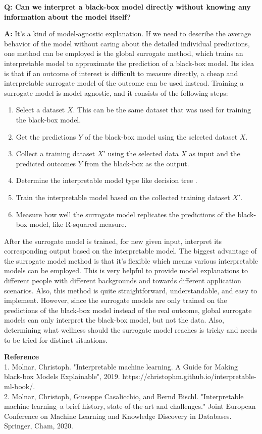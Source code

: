 \documentclass{article}
\begin{document}
\textbf{Q: Can we interpret a black-box model directly without knowing any information about the model itself?}

\vspace{0.5cm}
\textbf{A:} It's a kind of model-agnostic explanation. If we need to describe the average behavior of the model without caring about the detailed individual predictions, one method can be employed is the global surrogate method, which trains an interpretable model to approximate the prediction of a black-box model.
Its idea is that if an outcome of interest is difficult to measure directly, a cheap and interpretable surrogate model of the outcome can be used instead. 
Training a surrogate model is model-agnostic, and it consists of the following steps:
\begin{enumerate}
    \item Select a dataset $X$. This can be the same dataset that was used for training the black-box model.
    \item Get the predictions $Y$ of the black-box model using the selected dataset $X$.
    \item Collect a training dataset $X'$ using the selected data $X$ as input and the predicted outcomes $Y$ from the black-box as the output.
    \item Determine the interpretable model type like decision tree .
    \item Train the interpretable model based on the collected training dataset $X'$.
    \item Measure how well the surrogate model replicates the predictions of the black-box model, like R-squared measure.
\end{enumerate}

After the surrogate model is trained, for new given input, interpret its corresponding output based on the interpretable model. 
The biggest advantage of the surrogate model method is that it's flexible which means various interpretable models can be employed. This is very helpful to provide model explanations to different people with different backgrounds and towards different application scenarios. Also, this method is quite straightforward, understandable, and easy to implement. However, since the surrogate models are only trained on the predictions of the black-box model instead of the real outcome, global surrogate models can only interpret the black-box model, but not the data. Also, determining what wellness should the surrogate model reaches is tricky and needs to be tried for distinct situations.

\vspace{0.5cm}
\textbf{Reference}\\
1. Molnar, Christoph. "Interpretable machine learning. A Guide for Making black-box Models Explainable", 2019. https://christophm.github.io/interpretable-ml-book/.\\
2. Molnar, Christoph, Giuseppe Casalicchio, and Bernd Bischl. "Interpretable machine learning–a brief history, state-of-the-art and challenges." Joint European Conference on Machine Learning and Knowledge Discovery in Databases. Springer, Cham, 2020.
\end{document}
